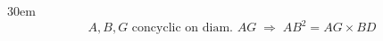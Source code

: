 \documentclass[border=4pt]{standalone}
\begin{document}
\begin{varwidth}{30em}
\large
\[ A,B,G \text{ concyclic on diam. } AG \;\Rightarrow\; AB^{2}=AG\times BD \]

\end{varwidth}
\end{document}
